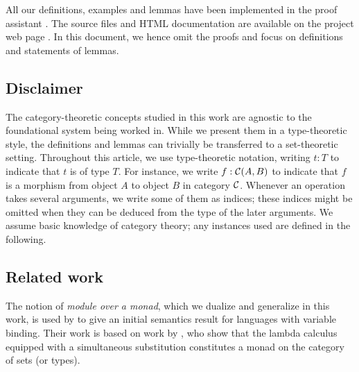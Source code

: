 \documentclass{amsart}
\newcommand{\fat}[1]{\textbf{#1}}
\begin{document}
%  
 All our definitions, examples and lemmas have been implemented in the proof assistant \coq \parencite{coq84pl3}.
 The \coq source files and HTML documentation are available on the project web page \parencite{trimat_coq}.
 In this document, we hence omit the proofs and focus on definitions and statements of lemmas.
 
 
 \subsection*{Disclaimer}The category-theoretic concepts studied in this work are agnostic to the foundational system being worked in.
 While we present them in a type-theoretic style, the definitions and lemmas can trivially be transferred to a set-theoretic setting.
 Throughout this article, we use type-theoretic notation,  writing $t:T$ to indicate that $t$ is of type $T$. 
 For instance, we write $f : {\mathcal{C}}(A,B)$ to indicate that $f$ is a morphism from object $A$ to object $B$ in category ${\mathcal{C}}$.
 Whenever an operation takes several arguments, we write some of them as indices; these indices might be omitted when 
 they can be deduced from the type of the later arguments.
 We assume basic knowledge of category theory; any instances used are defined in the following.
  
 \subsection*{Related work}
 The notion of \emph{module over a monad}, which we dualize and generalize in this work, is used by \textcite{DBLP:journals/iandc/HirschowitzM10}
 to give an initial semantics result for languages with variable binding. 
 Their work is based on work by \textcite{alt_reus},
 who show that the lambda calculus equipped with a simultaneous substitution constitutes a monad on the category of sets (or types).
 
\end{document}
